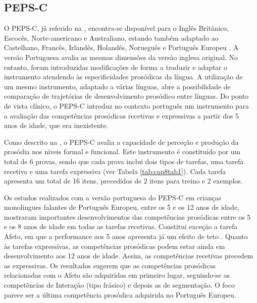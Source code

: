 \documentclass[output=paper,colorlinks,citecolor=brown,booklanguage=portuguese]{langscibook}
\begin{document}
\subsection{PEPS-C}\label{sec:cap8sec4.1}
O PEPS-C, já referido na , encontra-se disponível para o Inglês Britânico, Escocês, Norte-americano e Australiano, estando também adaptado ao Castelhano, Francês, Irlandês, Holandês, Norueguês \citep{Peppe2006} e Português Europeu \citep{Filipe2017}. A versão Portuguesa avalia as mesmas dimensões da versão inglesa original. No entanto, foram introduzidas modificações de forma a traduzir e adaptar o instrumento atendendo às especificidades prosódicas da língua. A utilização de um mesmo instrumento, adaptado a várias línguas, abre a possibilidade de comparação de trajetórias de desenvolvimento prosódico entre línguas. Do ponto de vista clínico, o PEPS-C introduz no contexto português um instrumento para a avaliação das competências prosódicas recetivas e expressivas a partir dos 5 anos de idade, que era inexistente.

Como descrito na , o PEPS-C avalia a capacidade de perceção e produção da prosódia nos níveis formal e funcional. Este instrumento é constituído por um total de 6 provas, sendo que cada prova inclui dois tipos de tarefas, uma tarefa recetiva e uma tarefa expressiva (ver Tabela \ref{tab:cap8tab1}). Cada tarefa apresenta um total de 16 itens, precedidos de 2 itens para treino e 2 exemplos.

Os estudos realizados com a versão portuguesa do PEPS-C em crianças monolingues falantes de Português Europeu, entre os 5 e os 12 anos de idade, mostraram importantes desenvolvimentos das competências prosódicas entre os 5 e os 8 anos de idade em todas as tarefas recetivas. Constitui exceção a tarefa Afeto, em que a performance aos 5 anos apresenta já um efeito de teto \citep{Filipe2017}. Quanto às tarefas expressivas, as competências prosódicas podem estar ainda em desenvolvimento aos 12 anos de idade. Assim, as competências recetivas precedem as expressivas.  Os resultados sugerem que as competências prosódicas relacionadas com o Afeto são adquiridas em primeiro lugar, seguindo-se as competências de Interação (tipo frásico) e depois as de segmentação. O foco parece ser a última competência prosódica adquirida no Português Europeu.
\end{document}
